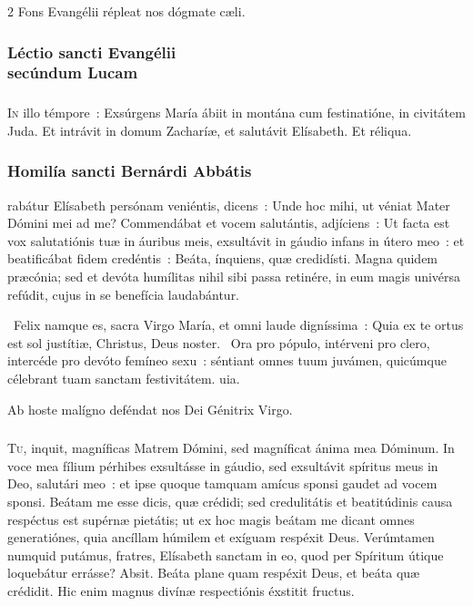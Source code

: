 \documentclass[9pt,twoside]{extarticle}
\begin{document}
\begin{multicols}{2}
\smallskip
\small {} Fons Evangélii répleat nos dógmate cæli.

\normalsize
\subsubsection*{\center  \normalfont Léctio sancti Evangélii\\ secúndum Lucam}
\subsubsection*{\center {}}
\lettrine{I}{n} illo témpore~: Exsúrgens María ábiit in montána cum festinatióne, in civitátem Juda. Et intrávit in domum Zacharíæ, et salutávit Elísabeth. Et réliqua.

\subsubsection*{\center \normalfont Homilía sancti Bernárdi Abbátis\\
\small {}}

\smallskip
{}rabátur Elísabeth persónam veniéntis, dicens~: Unde hoc mihi, ut véniat Mater Dómini mei ad me? Commendábat et vocem salutántis, adjíciens~: Ut facta est vox salutatiónis tuæ in áuribus meis, exsultávit in gáudio infans in útero meo~: et beatificábat fidem credéntis~: Beáta, ínquiens, quæ credidísti. Magna quidem præcónia; sed et devóta humílitas nihil sibi passa retinére, in eum magis univérsa refúdit, cujus in se benefícia laudabántur.

~Felix namque es, sacra Virgo María, et omni laude digníssima~: \textred{*} Quia ex te ortus est sol justítiæ, Christus, Deus noster.
~Ora pro pópulo, intérveni pro clero, intercéde pro devóto femíneo sexu~: séntiant omnes tuum juvámen, quicúmque célebrant tuam sanctam festivitátem. uia.

\smallskip
\small {} Ab hoste malígno deféndat nos Dei Génitrix Virgo.

\normalsize
\subsubsection*{\center {}}
\lettrine{T}{u}, inquit, magníficas Matrem Dómini, sed magníficat ánima mea Dóminum. In voce mea fílium pérhibes exsultásse in gáudio, sed exsultávit spíritus meus in Deo, salutári meo~: et ipse quoque tamquam amícus sponsi gaudet ad vocem sponsi. Beátam me esse dicis, quæ crédidi; sed credulitátis et beatitúdinis causa respéctus est supérnæ pietátis; ut ex hoc magis beátam me dicant omnes generatiónes, quia ancíllam húmilem et exíguam respéxit Deus. Verúmtamen numquid putámus, fratres, Elísabeth sanctam in eo, quod per Spíritum útique loquebátur errásse? Absit. Beáta plane quam respéxit Deus, et beáta quæ crédidit. Hic enim magnus divínæ respectiónis éxstitit fructus.


\end{multicols}
\end{document}
